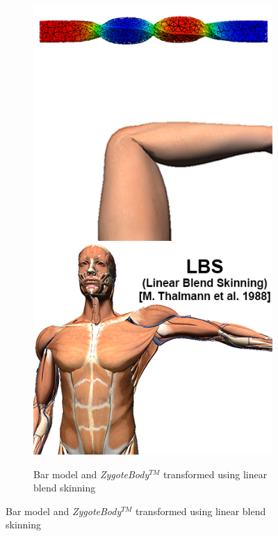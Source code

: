 \begin{figure}[ht]
    \begin{subfigure}[b]{0.32\linewidth}
        \centering
        {\includegraphics[width=\linewidth]{IMG/sLBS.png}}
        \caption{Bar model and \emph{ZygoteBody}$^{TM}$ transformed using linear blend skinning \label{subfig:sLBS}}
    \end{subfigure}

\end{figure}
